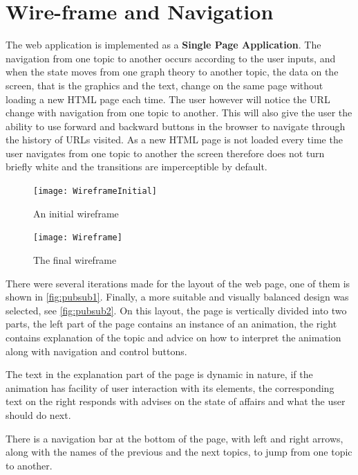 \section{Wire-frame and Navigation}
The web application is implemented as a \textbf{Single Page Application}. The navigation
from one topic to another occurs according to the user inputs, and when the state
moves from one graph theory to another topic, the data on the screen, that is
the graphics and the text, change on the same page without loading a new HTML page
each time. The user however will notice the URL change with navigation from one
topic to another. This will also give the user the ability to use forward and
backward buttons in the browser to navigate through the history of URLs
visited. As a new HTML page is not loaded every time the user navigates from
one topic to another the screen therefore does not turn briefly white and the
transitions are imperceptible by default.

\begin{figure}[H]
    \centering
    \begin{minipage}{.5\textwidth}
        \centering
        \texttt{[image: WireframeInitial]}
        \caption{An initial wireframe}
        \label{fig:pubsub1}
    \end{minipage}%
    \begin{minipage}{.5\textwidth}
        \centering
        \texttt{[image: Wireframe]}
        \caption{The final wireframe}
        \label{fig:pubsub2}
    \end{minipage}
\end{figure}

There were several iterations made for the layout of the web page, one of them
is shown in \autoref{fig:pubsub1}. Finally, a more suitable and visually balanced design was selected, see
\autoref{fig:pubsub2}. On this layout, the page is vertically divided into two
parts, the left part of the page contains an instance of an animation, the
right contains explanation of the topic and advice on how to interpret the
animation along with navigation and control buttons. 

The text in the explanation part of the page is dynamic in nature, if the
animation has facility of user interaction with its elements, the
corresponding text on the right responds with advises on the state of affairs
and what the user should do next.

There is a navigation bar at the bottom of the page, with left and right
arrows, along with the names of the previous and the next topics, to jump from
one topic to another.

